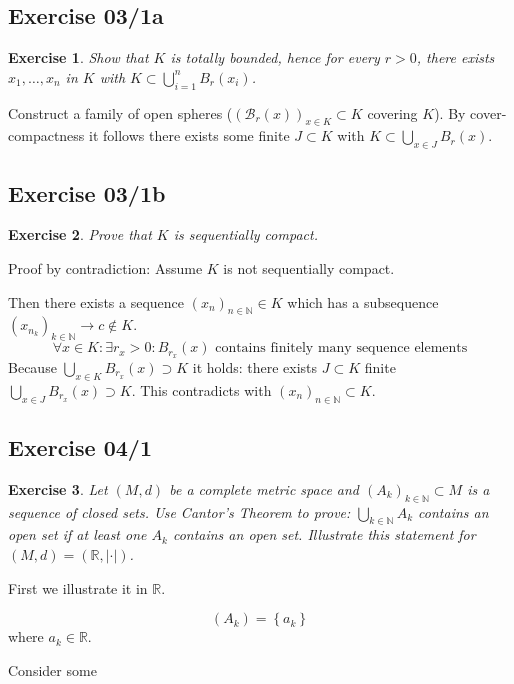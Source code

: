 \documentclass{article}
\newtheorem{ex}{Exercise} %
\newcommand{\set}[1]{\left\{#1\right\}}
\newcommand{\card}[1]{\left|#1\right|}
\begin{document}
\subsection{Exercise 03/1a}
\begin{ex}
  Show that $K$ is totally bounded, hence for every $r>0$, there exists $x_1, \dots, x_n$ in $K$
  with $K \subset \bigcup_{i=1}^n B_r(x_i)$.
\end{ex}

Construct a family of open spheres ($\left(\mathcal B_r(x)\right)_{x \in K} \subset K$ covering $K$).
By cover-compactness it follows there exists some finite $J \subset K$ with $K \subset \bigcup_{x \in J} B_r(x)$.

\subsection{Exercise 03/1b}
\begin{ex}
  Prove that $K$ is sequentially compact.
\end{ex}

Proof by contradiction: Assume $K$ is not sequentially compact.

Then there exists a sequence $(x_n)_{n \in \mathbb N} \in K$ which has a subsequence $(x_{n_k})_{k \in \mathbb N} \to c \not\in K$.
\[ \forall x \in K: \exists r_x > 0: B_{r_x}(x) \text{ contains finitely many sequence elements} \]
Because $\bigcup_{x \in K} B_{r_x}(x) \supset K$ it holds: there exists $J \subset K$ finite $\bigcup_{x \in J} B_{r_x}(x) \supset K$.
This contradicts with $(x_n)_{n \in \mathbb N} \subset K$.

\subsection{Exercise 04/1}
\begin{ex}
  Let $(M,d)$ be a complete metric space and $(A_k)_{k \in \mathbb N} \subset M$
  is a sequence of closed sets. Use Cantor's Theorem to prove:
  $\bigcup_{k \in \mathbb N} A_k$ contains an open set if at least one $A_k$
  contains an open set. Illustrate this statement for $(M,d) = (\mathbb R, \card{\cdot})$.
\end{ex}

First we illustrate it in $\mathbb R$.

\[ (A_k) = \set{a_k} \]
where $a_k \in \mathbb R$.

Consider some 
\end{document}
